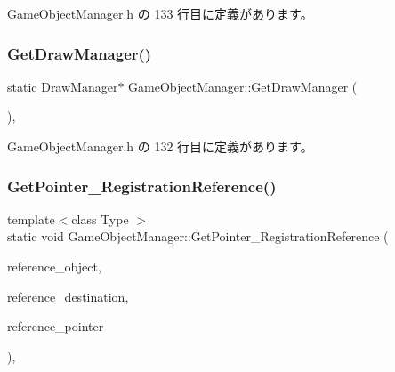  Game\+Object\+Manager.\+h の 133 行目に定義があります。

\mbox{\label{class_game_object_manager_a862e76bfd74495c20bddd377c62a22b7}} 
\subsubsection{\texorpdfstring{Get\+Draw\+Manager()}{GetDrawManager()}}
{\footnotesize\ttfamily static \mbox{\hyperlink{class_draw_manager}{Draw\+Manager}}$\ast$ Game\+Object\+Manager\+::\+Get\+Draw\+Manager (\begin{DoxyParamCaption}{ }\end{DoxyParamCaption})\hspace{0.3cm}{\ttfamily [inline]}, {\ttfamily [static]}}



 Game\+Object\+Manager.\+h の 132 行目に定義があります。

\mbox{\label{class_game_object_manager_a4b905d160c31b234686a3d46c0743adb}} 
\subsubsection{\texorpdfstring{Get\+Pointer\+\_\+\+Registration\+Reference()}{GetPointer\_RegistrationReference()}}
{\footnotesize\ttfamily template$<$class Type $>$ \\
static void Game\+Object\+Manager\+::\+Get\+Pointer\+\_\+\+Registration\+Reference (\begin{DoxyParamCaption}\item[{\mbox{\hyperlink{class_game_object_base}{Game\+Object\+Base}} $\ast$}]{reference\+\_\+object,  }\item[{Type $\ast$}]{reference\+\_\+destination,  }\item[{Type $\ast$}]{reference\+\_\+pointer }\end{DoxyParamCaption})\hspace{0.3cm}{\ttfamily [inline]}, {\ttfamily [static]}}



